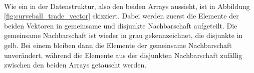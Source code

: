 \\
%
%
%
%
Wie ein \ct{} in der Datenstruktur, also den beiden Arrays aussieht, ist 
in Abbildung \ref{fig:curveball_trade_vector} skizziert. Dabei werden zuerst die Elemente
der beiden Vektoren in gemeinsame und disjunkte Nachbarschaft aufgeteilt. Die gemeinsame Nachbarschaft ist
wieder in grau gekennzeichnet, die disjunkte in gelb. Bei einem \ct{} bleiben dann die Elemente 
der gemeinsame Nachbarschaft unverändert, während die Elemente aus der 
disjunkten Nachbarschaft zufällig zwischen den beiden 
Arrays getauscht werden.




